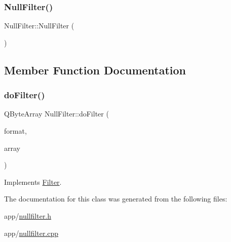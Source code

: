 \subsubsection{\texorpdfstring{Null\+Filter()}{NullFilter()}}
{\footnotesize\ttfamily Null\+Filter\+::\+Null\+Filter (\begin{DoxyParamCaption}{ }\end{DoxyParamCaption})}



\subsection{Member Function Documentation}
\hypertarget{class_null_filter_a738c372168e34415189cb289ead46479}{}\label{class_null_filter_a738c372168e34415189cb289ead46479} 
\subsubsection{\texorpdfstring{do\+Filter()}{doFilter()}}
{\footnotesize\ttfamily Q\+Byte\+Array Null\+Filter\+::do\+Filter (\begin{DoxyParamCaption}\item[{Q\+Audio\+Format}]{format,  }\item[{Q\+Byte\+Array}]{array }\end{DoxyParamCaption})\hspace{0.3cm}{\ttfamily [virtual]}}



Implements \hyperlink{class_filter_aa401218a142d916f84aafece09eac301}{Filter}.



The documentation for this class was generated from the following files\+:\begin{DoxyCompactItemize}
\item 
app/\hyperlink{nullfilter_8h}{nullfilter.\+h}\item 
app/\hyperlink{nullfilter_8cpp}{nullfilter.\+cpp}\end{DoxyCompactItemize}
